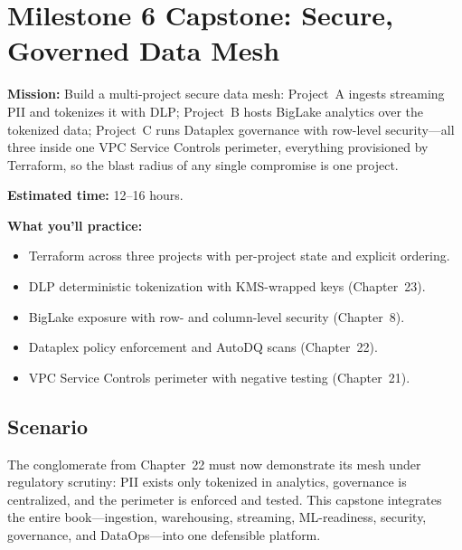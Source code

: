 \section{Milestone 6 Capstone: Secure, Governed Data Mesh}\label{sec:ch24-capstone}

\begin{capstonebox}
\textbf{Mission:} Build a multi-project secure data mesh: Project~A ingests streaming PII and tokenizes it with DLP; Project~B hosts BigLake analytics over the tokenized data; Project~C runs Dataplex governance with row-level security---all three inside one VPC Service Controls perimeter, everything provisioned by Terraform, so the blast radius of any single compromise is one project.

\textbf{Estimated time:} 12--16 hours.

\textbf{What you'll practice:}
\begin{itemize}
    \item Terraform across three projects with per-project state and explicit ordering.
    \item DLP deterministic tokenization with KMS-wrapped keys (Chapter~23).
    \item BigLake exposure with row- and column-level security (Chapter~8).
    \item Dataplex policy enforcement and AutoDQ scans (Chapter~22).
    \item VPC Service Controls perimeter with negative testing (Chapter~21).
\end{itemize}
\end{capstonebox}

\subsection*{Scenario}
The conglomerate from Chapter~22 must now demonstrate its mesh under regulatory scrutiny: PII exists only tokenized in analytics, governance is centralized, and the perimeter is enforced and tested. This capstone integrates the entire book---ingestion, warehousing, streaming, ML-readiness, security, governance, and DataOps---into one defensible platform.

